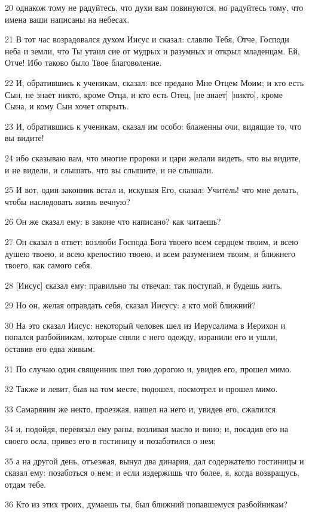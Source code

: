 \par 20 однакож тому не радуйтесь, что духи вам повинуются, но радуйтесь тому, что имена ваши написаны на небесах.
\par 21 В тот час возрадовался духом Иисус и сказал: славлю Тебя, Отче, Господи неба и земли, что Ты утаил сие от мудрых и разумных и открыл младенцам. Ей, Отче! Ибо таково было Твое благоволение.
\par 22 И, обратившись к ученикам, сказал: все предано Мне Отцем Моим; и кто есть Сын, не знает никто, кроме Отца, и кто есть Отец, [не знает] [никто], кроме Сына, и кому Сын хочет открыть.
\par 23 И, обратившись к ученикам, сказал им особо: блаженны очи, видящие то, что вы видите!
\par 24 ибо сказываю вам, что многие пророки и цари желали видеть, что вы видите, и не видели, и слышать, что вы слышите, и не слышали.
\par 25 И вот, один законник встал и, искушая Его, сказал: Учитель! что мне делать, чтобы наследовать жизнь вечную?
\par 26 Он же сказал ему: в законе что написано? как читаешь?
\par 27 Он сказал в ответ: возлюби Господа Бога твоего всем сердцем твоим, и всею душею твоею, и всею крепостию твоею, и всем разумением твоим, и ближнего твоего, как самого себя.
\par 28 [Иисус] сказал ему: правильно ты отвечал; так поступай, и будешь жить.
\par 29 Но он, желая оправдать себя, сказал Иисусу: а кто мой ближний?
\par 30 На это сказал Иисус: некоторый человек шел из Иерусалима в Иерихон и попался разбойникам, которые сняли с него одежду, изранили его и ушли, оставив его едва живым.
\par 31 По случаю один священник шел тою дорогою и, увидев его, прошел мимо.
\par 32 Также и левит, быв на том месте, подошел, посмотрел и прошел мимо.
\par 33 Самарянин же некто, проезжая, нашел на него и, увидев его, сжалился
\par 34 и, подойдя, перевязал ему раны, возливая масло и вино; и, посадив его на своего осла, привез его в гостиницу и позаботился о нем;
\par 35 а на другой день, отъезжая, вынул два динария, дал содержателю гостиницы и сказал ему: позаботься о нем; и если издержишь что более, я, когда возвращусь, отдам тебе.
\par 36 Кто из этих троих, думаешь ты, был ближний попавшемуся разбойникам?
